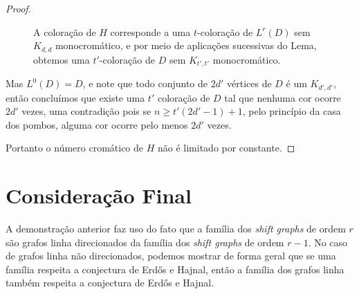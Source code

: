 \begin{proof}
\begin{figure}[H]
\centering
{}
\caption{A coloração de $H$ corresponde a uma $t$-coloração de $L^r(D)$ sem $K_{d,d}$ monocromático, e por meio de aplicações sucessivas do Lema, obtemos uma $t'$-coloração de $D$ sem $K_{t',t'}$ monocromático.}
\label{fig:shiftsequence}
\end{figure}

Mas $L^0(D) = D$, e note que todo conjunto de $2d'$ vértices de $D$ é um $K_{d',d'}$, então concluímos que existe uma $t'$ coloração de $D$ tal que nenhuma cor ocorre $2d'$ vezes, uma contradição pois se $n \geq t'(2d'-1)+1$, pelo princípio da casa dos pombos, alguma cor ocorre pelo menos $2d'$ vezes.

Portanto o número cromático de $H$ não é limitado por constante.
\end{proof}

\section{Consideração Final}

A demonstração anterior faz uso do fato que a família dos \textit{shift graphs} de ordem $r$ são grafos linha direcionados da família dos \textit{shift graphs} de ordem $r-1$. No caso de grafos linha não direcionados, podemos mostrar de forma geral que se uma família respeita a conjectura de Erd\H{o}s e Hajnal, então a família dos grafos linha também respeita a conjectura de Erd\H{o}s e Hajnal.

